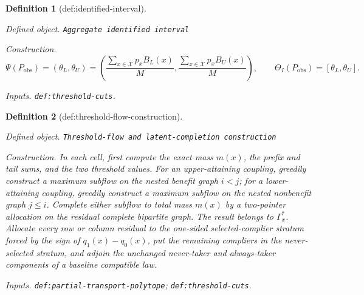 \documentclass{article}
\newtheorem{definition}{Definition}
\begin{document}
\begin{definition}[def:identified-interval]\label{def:identified-interval}
\par\smallskip\noindent\emph{Defined object.} \texttt{Aggregate identified interval}
\par\smallskip\noindent\emph{Construction.} \[\Psi(P_{\mathrm{obs}})=(\theta_L,\theta_U)=\left(\frac{\sum_{x\in\mathcal X}p_xB_L(x)}{M},\frac{\sum_{x\in\mathcal X}p_xB_U(x)}{M}\right),\qquad \Theta_I(P_{\mathrm{obs}})=[\theta_L,\theta_U].\]
\par\smallskip\noindent\emph{Inputs.} \texttt{def:\allowbreak{}threshold-\allowbreak{}cuts}.
\end{definition}

\begin{definition}[def:threshold-flow-construction]\label{def:threshold-flow-construction}
\par\smallskip\noindent\emph{Defined object.} \texttt{Threshold-\allowbreak{}flow and latent-\allowbreak{}completion construction}
\par\smallskip\noindent\emph{Construction.} In each cell, first compute the exact mass \(m(x)\), the prefix and tail sums, and the two threshold values.  For an upper-attaining coupling, greedily construct a maximum subflow on the nested benefit graph \(i<j\); for a lower-attaining coupling, greedily construct a maximum subflow on the nested nonbenefit graph \(j\le i\).  Complete either subflow to total mass \(m(x)\) by a two-pointer allocation on the residual complete bipartite graph.  The result belongs to \(\Gamma_x^{\ast}\).  Allocate every row or column residual to the one-sided selected-complier stratum forced by the sign of \(q_1(x)-q_0(x)\), put the remaining compliers in the never-selected stratum, and adjoin the unchanged never-taker and always-taker components of a baseline compatible law.
\par\smallskip\noindent\emph{Inputs.} \texttt{def:\allowbreak{}partial-\allowbreak{}transport-\allowbreak{}polytope}; \texttt{def:\allowbreak{}threshold-\allowbreak{}cuts}.
\end{definition}
\end{document}
